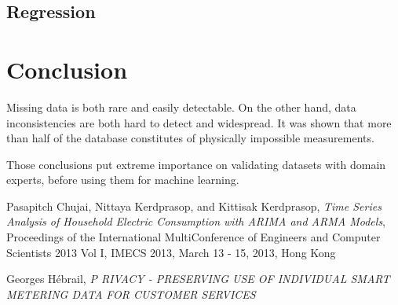 \documentclass[11pt]{article}
\newcommand{\para}[0]{\par\vspace{0.5cm}}
\begin{document}
\subsection{Regression}
\section{Conclusion}
Missing data is both rare and easily detectable.
On the other hand, data inconsistencies are both hard to detect and widespread.
It was shown that more than half of the database constitutes of physically impossible measurements.
\para
Those conclusions put extreme importance on validating datasets with domain experts, before using them for machine learning.


\begin{thebibliography}{9}

  Pasapitch Chujai, Nittaya Kerdprasop, and Kittisak Kerdprasop,
  \textit{Time Series Analysis of Household Electric Consumption with ARIMA and ARMA Models},
  Proceedings of the International MultiConference of Engineers and Computer Scientists 2013 Vol I,
  IMECS 2013, March 13 - 15, 2013, Hong Kong

  Georges Hébrail,
  \textit{P RIVACY - PRESERVING USE OF INDIVIDUAL SMART METERING DATA FOR CUSTOMER SERVICES}

\end{thebibliography}
 
\end{document}
